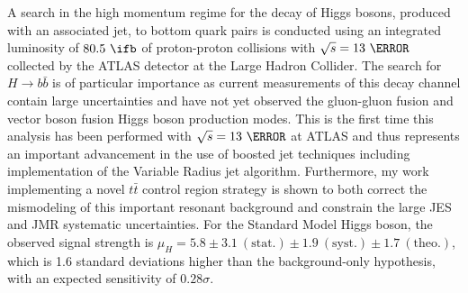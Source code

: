 A search in the high momentum regime for the decay of Higgs bosons, produced
with an associated jet, to bottom quark pairs is conducted using an integrated
luminosity of $80.5~\ifb$ of proton-proton collisions with $\sqrt{s} = 13~\TeV$
collected by the ATLAS detector at the Large Hadron Collider.  The search for
$H \rightarrow b\bar{b}$ is of particular importance as current measurements of
this decay channel contain large uncertainties and have not yet observed the
gluon-gluon fusion and vector boson fusion Higgs boson production modes. This
is the first time this analysis has been performed with $\sqrt{s} = 13~\TeV$ at
ATLAS and thus represents an important advancement in the use of boosted jet
techniques including implementation of the Variable Radius jet algorithm.
Furthermore, my work implementing a novel $t\bar{t}$ control region strategy is
shown to both correct the mismodeling of this important resonant background and
constrain the large JES and JMR systematic uncertainties.  For the Standard
Model Higgs boson, the observed signal strength is $\mu_{H} = 5.8 \pm
3.1~\mathrm{(stat.)} \pm 1.9~\mathrm{(syst.)} \pm 1.7~\mathrm{(theo.)}$, which
is 1.6 standard deviations higher than the background-only hypothesis, with an
expected sensitivity of $0.28\sigma.$
